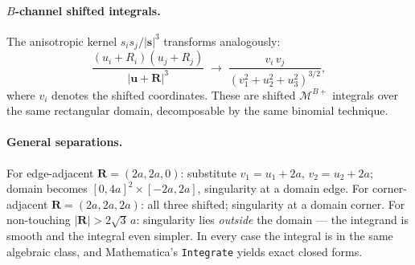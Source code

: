 \documentclass[11pt,a4paper]{article}
\newcommand{\bs}{\bm{s}}
\newcommand{\bu}{\bm{u}}
\newcommand{\bR}{\bm{R}}
\theoremstyle{plain}
\theoremstyle{definition}
\theoremstyle{remark}
\begin{document}
\paragraph{$B$-channel shifted integrals.}
The anisotropic kernel $s_i s_j / |\bs|^3$ transforms analogously:
\begin{equation}
  \frac{(u_i + R_i)(u_j + R_j)}{|\bu + \bR|^3}
  \;\longrightarrow\;
  \frac{v_i\,v_j}{(v_1^2 + u_2^2 + u_3^2)^{3/2}},
  \label{eq:MpB-shifted}
\end{equation}
where $v_i$ denotes the shifted coordinates.  These are shifted
$\mathcal{M}^{B+}$ integrals over the same rectangular domain,
decomposable by the same binomial technique.

\paragraph{General separations.}
For edge-adjacent $\bR = (2a, 2a, 0)$: substitute $v_1 = u_1 + 2a$,
$v_2 = u_2 + 2a$; domain becomes $[0,4a]^2 \times [-2a,2a]$,
singularity at a domain edge.  For corner-adjacent
$\bR = (2a, 2a, 2a)$: all three shifted; singularity at a domain
corner.  For non-touching $|\bR| > 2\sqrt{3}\,a$: singularity
lies \emph{outside} the domain --- the integrand is smooth and the
integral even simpler.  In every case the integral is in the same
algebraic class, and Mathematica's \texttt{Integrate} yields exact
closed forms.
\end{document}
